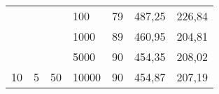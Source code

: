 \documentclass{article}
\begin{document}
\begin{table}[h]
\begin{tabular}{lllllll}
			&                                                &                                                                       &                                                                           &                                                                              &                                                                                     &                                                                                       \\ \hline
			\multicolumn{1}{|l|}{}                                                 & \multicolumn{1}{l|}{}                          & \multicolumn{1}{l|}{}                                                 & \multicolumn{1}{l|}{100}                                                  & \multicolumn{1}{l|}{79}                                                      & \multicolumn{1}{l|}{487,25}                                                         & \multicolumn{1}{l|}{226,84}                                                           \\ \cline{4-7} 
			\multicolumn{1}{|l|}{}                                                 & \multicolumn{1}{l|}{}                          & \multicolumn{1}{l|}{}                                                 & \multicolumn{1}{l|}{1000}                                                 & \multicolumn{1}{l|}{89}                                                      & \multicolumn{1}{l|}{460,95}                                                         & \multicolumn{1}{l|}{204,81}                                                           \\ \cline{4-7} 
			\multicolumn{1}{|l|}{}                                                 & \multicolumn{1}{l|}{}                          & \multicolumn{1}{l|}{}                                                 & \multicolumn{1}{l|}{5000}                                                 & \multicolumn{1}{l|}{90}                                                      & \multicolumn{1}{l|}{454,35}                                                         & \multicolumn{1}{l|}{208,02}                                                           \\ \cline{4-7} 
			\multicolumn{1}{|l|}{\multirow{-4}{*}{10}}                             & \multicolumn{1}{l|}{\multirow{-4}{*}{5}}       & \multicolumn{1}{l|}{\multirow{-4}{*}{50}}                             & \multicolumn{1}{l|}{10000}                                                & \multicolumn{1}{l|}{90}                                                      & \multicolumn{1}{l|}{454,87}                                                         & \multicolumn{1}{l|}{207,19}                                                           \\ \hline

\end{tabular}
\end{table}
\end{document}
